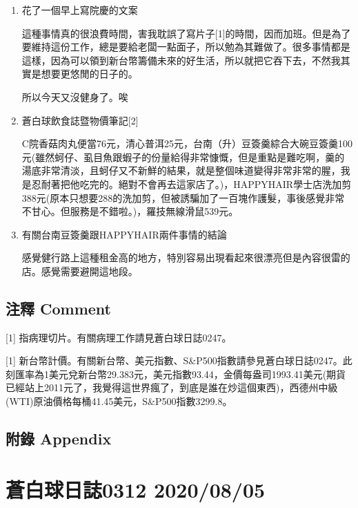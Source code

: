 \documentclass[a5paper, 11pt
]{book}
\begin{document}
\begin{enumerate}
\def\labelenumi{\arabic{enumi}.}
\item
  花了一個早上寫院慶的文案

  這種事情真的很浪費時間，害我耽誤了寫片子{[}1{]}的時間，因而加班。但是為了要維持這份工作，總是要給老闆一點面子，所以勉為其難做了。很多事情都是這樣，因為可以領到新台幣籌備未來的好生活，所以就把它吞下去，不然我其實是想要更悠閒的日子的。

  所以今天又沒健身了。唉
\item
  蒼白球飲食誌暨物價筆記{[}2{]}

  C院香菇肉丸便當76元，清心普洱25元，台南（升）豆簽羹綜合大碗豆簽羹100元(雖然蚵仔、虱目魚跟蝦子的份量給得非常慷慨，但是重點是難吃啊，羹的湯底非常清淡，且蚵仔又不新鮮的結果，就是整個味道變得非常非常的腥，我是忍耐著把他吃完的。絕對不會再去這家店了。)，HAPPYHAIR學士店洗加剪388元(原本只想要288的洗加剪，但被誘騙加了一百塊作護髮，事後感覺非常不甘心。但服務是不錯啦。)，羅技無線滑鼠539元。
\item
  有關台南豆簽羹跟HAPPYHAIR兩件事情的結論

  感覺健行路上這種租金高的地方，特別容易出現看起來很漂亮但是內容很雷的店。感覺需要避開這地段。
\end{enumerate}

\hypertarget{ux6ce8ux91cb-comment-64}{%
\subsection{注釋 Comment}\label{ux6ce8ux91cb-comment-64}}

{[}1{]} 指病理切片。有關病理工作請見蒼白球日誌0247。

{[}1{]}
新台幣計價。有關新台幣、美元指數、S\&P500指數請參見蒼白球日誌0247。此刻匯率為1美元兌新台幣29.383元，美元指數93.44，金價每盎司1993.41美元(期貨已經站上2011元了，我覺得這世界瘋了，到底是誰在炒這個東西)，西德州中級(WTI)原油價格每桶41.45美元，S\&P500指數3299.8。

\hypertarget{ux9644ux9304-appendix-64}{%
\subsection{附錄 Appendix}\label{ux9644ux9304-appendix-64}}

\hypertarget{ux84bcux767dux7403ux65e5ux8a8c0312-20200805}{%
\section{蒼白球日誌0312
2020/08/05}\label{ux84bcux767dux7403ux65e5ux8a8c0312-20200805}}
\end{document}
